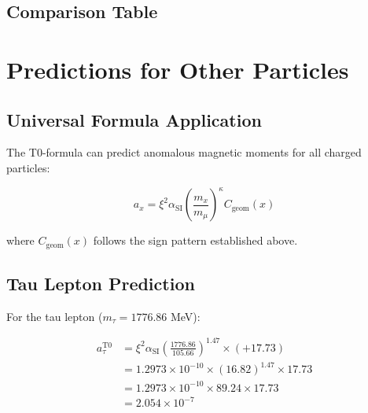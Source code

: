 \documentclass[12pt,a4paper]{article}
\newcommand{\xipar}{\xi}
\newcommand{\alphaSI}{\alpha_{\text{SI}}}
\newcommand{\Cgeom}{C_{\text{geom}}}
\newcommand{\kappaT}{\kappa}
\newcommand{\mmu}{m_{\mu}}
\begin{document}
	\subsection{Comparison Table}
	
\begin{table}[H]
	\centering
	\caption{T0-Theory Predictions vs. Experimental Results}
\end{table}
	
	\section{Predictions for Other Particles}
	
	\subsection{Universal Formula Application}
	
	The T0-formula can predict anomalous magnetic moments for all charged particles:
	
	\begin{equation}
		a_x = \xipar^2 \alphaSI \left(\frac{m_x}{\mmu}\right)^{\kappaT} \Cgeom(x)
	\end{equation}
	
	where $\Cgeom(x)$ follows the sign pattern established above.
	
	\subsection{Tau Lepton Prediction}
	
	For the tau lepton ($m_\tau = 1776.86$ MeV):
	
	\begin{align}
		a_\tau^{\text{T0}} &= \xipar^2 \alphaSI \left(\frac{1776.86}{105.66}\right)^{1.47} \times (+17.73) \\
		&= 1.2973 \times 10^{-10} \times (16.82)^{1.47} \times 17.73 \\
		&= 1.2973 \times 10^{-10} \times 89.24 \times 17.73 \\
		&= 2.054 \times 10^{-7}
	\end{align}
	
\end{document}
